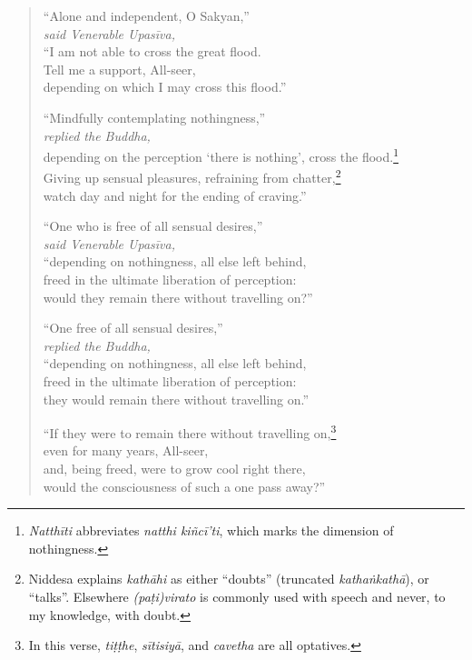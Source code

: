 \documentclass[12pt,openany]{book}%
\newcommand*{\scspeaker}[1]{\hspace{2em}\textit{#1}}
\begin{document}
\begin{verse}%
“Alone and independent, O Sakyan,” \\
\scspeaker{said Venerable \textsanskrit{Upasīva}, }\\
“I am not able to cross the great flood. \\
Tell me a support, All-seer, \\
depending on which I may cross this flood.” 

“Mindfully contemplating nothingness,” \\
\scspeaker{replied the Buddha, }\\
depending on the perception ‘there is nothing’, cross the flood.\footnote{\textit{\textsanskrit{Natthīti}} abbreviates \textit{natthi \textsanskrit{kiñcī}’ti}, which marks the dimension of nothingness. } \\
Giving up sensual pleasures, refraining from chatter,\footnote{Niddesa explains \textit{\textsanskrit{kathāhi}} as either “doubts” (truncated \textit{\textsanskrit{kathaṅkathā}}), or “talks”. Elsewhere \textit{(\textsanskrit{paṭi})virato} is commonly used with speech and never, to my knowledge, with doubt. } \\
watch day and night for the ending of craving.” 

“One who is free of all sensual desires,” \\
\scspeaker{said Venerable \textsanskrit{Upasīva}, }\\
“depending on nothingness, all else left behind, \\
freed in the ultimate liberation of perception: \\
would they remain there without travelling on?” 

“One free of all sensual desires,” \\
\scspeaker{replied the Buddha, }\\
“depending on nothingness, all else left behind, \\
freed in the ultimate liberation of perception: \\
they would remain there without travelling on.” 

“If they were to remain there without travelling on,\footnote{In this verse, \textit{\textsanskrit{tiṭṭhe}}, \textit{\textsanskrit{sītisiyā}}, and \textit{cavetha} are all optatives. } \\
even for many years, All-seer, \\
and, being freed, were to grow cool right there, \\
would the consciousness of such a one pass away?” 


\end{verse}
\end{document}
